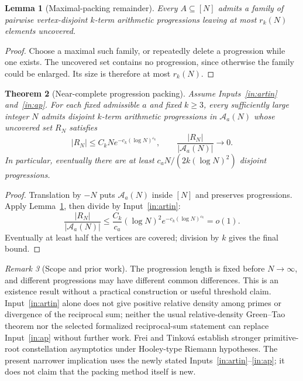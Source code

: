\documentclass[11pt]{article}
\newtheorem{theorem}{Theorem}[section]
\newtheorem{lemma}[theorem]{Lemma}
\theoremstyle{definition}
\theoremstyle{remark}
\newtheorem{remark}[theorem]{Remark}
\begin{document}
\begin{lemma}[Maximal-packing remainder]\label{lem:packing}
Every $A\subseteq[N]$ admits a family of pairwise vertex-disjoint $k$-term arithmetic progressions leaving at most $r_k(N)$ elements uncovered.
\end{lemma}
\begin{proof}
Choose a maximal such family, or repeatedly delete a progression while one exists. The uncovered set contains no progression, since otherwise the family could be enlarged. Its size is therefore at most $r_k(N)$.
\end{proof}

\begin{theorem}[Near-complete progression packing]\label{thm:artin}
Assume Inputs~\ref{in:artin} and~\ref{in:ap}. For each fixed admissible $a$ and fixed $k\ge3$, every sufficiently large integer $N$ admits disjoint $k$-term arithmetic progressions in $\mathcal A_a(N)$ whose uncovered set $R_N$ satisfies
\[
|R_N|\le C_kN e^{-c_k(\log N)^{\varepsilon_k}},\qquad
\frac{|R_N|}{|\mathcal A_a(N)|}\longrightarrow0.
\]
In particular, eventually there are at least $c_aN/(2k(\log N)^2)$ disjoint progressions.
\end{theorem}
\begin{proof}
Translation by $-N$ puts $\mathcal A_a(N)$ inside $[N]$ and preserves progressions. Apply Lemma~\ref{lem:packing}, then divide by Input~\ref{in:artin}:
\[
\frac{|R_N|}{|\mathcal A_a(N)|}
\le\frac{C_k}{c_a}(\log N)^2e^{-c_k(\log N)^{\varepsilon_k}}=o(1).
\]
Eventually at least half the vertices are covered; division by $k$ gives the final bound.
\end{proof}

\begin{remark}[Scope and prior work]
The progression length is fixed before $N\to\infty$, and different progressions may have different common differences. This is an existence result without a practical construction or useful threshold claim. Input~\ref{in:artin} alone does not give positive relative density among primes or divergence of the reciprocal sum; neither the usual relative-density Green--Tao theorem nor the selected formalized reciprocal-sum statement can replace Input~\ref{in:ap} without further work. Frei and Tinkov\'a \cite[Theorem 1.2]{constellations} establish stronger primitive-root constellation asymptotics under Hooley-type Riemann hypotheses. The present narrower implication uses the newly stated Inputs~\ref{in:artin}--\ref{in:ap}; it does not claim that the packing method itself is new.
\end{remark}
\end{document}

